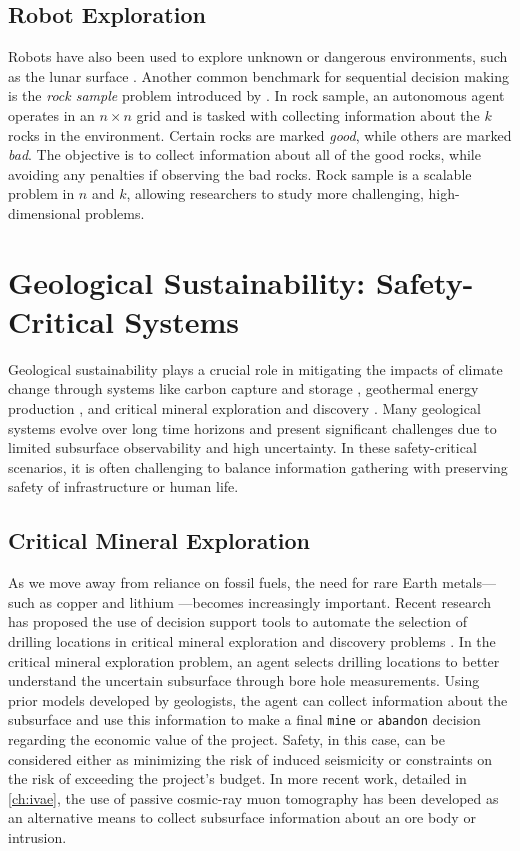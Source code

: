 \subsection{Robot Exploration}
Robots have also been used to explore unknown or dangerous environments, such as the lunar surface \cite{balaban2020health}.
Another common benchmark for sequential decision making is the \textit{rock sample} problem introduced by \textcite{smith2004heuristic}.
In rock sample, an autonomous agent operates in an $n \times n$ grid and is tasked with collecting information about the $k$ rocks in the environment.
Certain rocks are marked \textit{good}, while others are marked \textit{bad}.
The objective is to collect information about all of the good rocks, while avoiding any penalties if observing the bad rocks.
Rock sample is a scalable problem in $n$ and $k$, allowing researchers to study more challenging, high-dimensional problems.


\section{Geological Sustainability: Safety-Critical Systems}
Geological sustainability plays a crucial role in mitigating the impacts of climate change through systems like carbon capture and storage \cite{boothandford2014carbon}, geothermal energy production \cite{aikin2019enhanced}, and critical mineral exploration and discovery \cite{mern2023intelligent}.
Many geological systems evolve over long time horizons and present significant challenges due to limited subsurface observability and high uncertainty.
In these safety-critical scenarios, it is often challenging to balance information gathering with preserving safety of infrastructure or human life.

\subsection{Critical Mineral Exploration}
As we move away from reliance on fossil fuels, the need for rare Earth metals---such as copper and lithium \cite{sovacool2020sustainable}---becomes increasingly important.
Recent research has proposed the use of decision support tools to automate the selection of drilling locations in critical mineral exploration and discovery problems \cite{mern2023intelligent}.
In the critical mineral exploration problem, an agent selects drilling locations to better understand the uncertain subsurface through bore hole measurements.
Using prior models developed by geologists, the agent can collect information about the subsurface and use this information to make a final \texttt{mine} or \texttt{abandon} decision regarding the economic value of the project.
Safety, in this case, can be considered either as minimizing the risk of induced seismicity \cite{gibowicz2009seismicity} or constraints on the risk of exceeding the project's budget.
In more recent work, detailed in \cref{ch:ivae}, the use of passive cosmic-ray muon tomography \cite{lechmann2021muon} has been developed as an alternative means to collect subsurface information about an ore body or intrusion.


